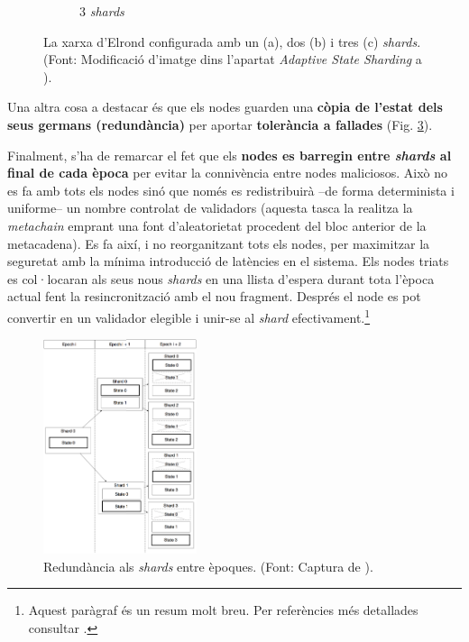 \documentclass[11pt,a4paper]{article}
\begin{document}
\begin{figure}[h]
\begin{subfigure}[b]{0.55\textwidth}
            \caption[3 \textit{shards}]%
            {{\small 3 \textit{shards}}}    
            \label{fig:sharding01c}
        \end{subfigure}
        \hfill
        \caption[La xarxa d'Elrond configurada amb un (a), dos (b) i tres (c) \textit{shards}.]
        {\small La xarxa d'Elrond configurada amb un (a), dos (b) i tres (c) \textit{shards}. (Font: Modificació d'imatge dins l'apartat \textit{Adaptive State Sharding} a \cite{elrond2022}).} 
        \label{fig:shardingtodo}
\end{figure}

Una altra cosa a destacar és que els nodes guarden una \textbf{còpia de l'estat dels seus germans (redundància)} per aportar \textbf{tolerància a fallades} (Fig. \ref{fig:shardred}).

Finalment, s'ha de remarcar el fet que els \textbf{nodes es barregin entre \textit{shards} al final de cada època} per evitar la connivència entre nodes maliciosos. Això no es fa amb tots els nodes sinó que només es redistribuirà –de forma determinista i uniforme– un nombre controlat de validadors (aquesta tasca la realitza la \textit{metachain} emprant una font d'aleatorietat procedent del bloc anterior de la metacadena). Es fa així, i no reorganitzant tots els nodes, per maximitzar la seguretat amb la mínima introducció de latències en el sistema. Els nodes triats es col·locaran als seus nous \textit{shards} en una llista d'espera durant tota l'època actual fent la resincronització amb el nou fragment. Després el node es pot convertir en un validador elegible i unir-se al \textit{shard} efectivament.\footnote{Aquest paràgraf és un resum molt breu. Per referències més detallades consultar \cite{elrond2019}.}

\begin{figure}[h]
\includegraphics[width=0.4\textwidth]{shardred.png}
\centering
\caption{Redundància als \textit{shards} entre èpoques. (Font: Captura de \cite{elrond2019}).}
\label{fig:shardred}
\end{figure}
\end{document}
